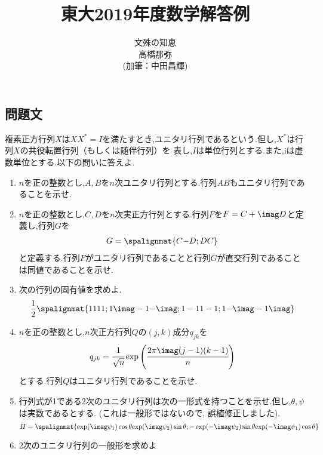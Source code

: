 \documentclass[dvipdfmx,titlepage, 11pt, a4paper]{jsarticle}%
\title{\Huge 東大2019年度数学解答例\\[10mm]}
\author{{\LARGE 文殊の知恵}\\[1mm]\LARGE 高橋那弥\\(加筆：中田昌輝)}
\date{}
\begin{document}
\maketitle
\tableofcontents %
\newpage
\setcounter{tocdepth}{3}%
\section{}%
\subsection{問題文}
複素正方行列$X$は$XX^{\ast}=I$を満たすとき,ユニタリ行列であるという.但し,$X^{\ast}$は行列$X$の共役転置行列（もしくは随伴行列）を
表し,$I$は単位行列とする.また,iは虚数単位とする.以下の問いに答えよ.
\begin{enumerate}[(1)]
    \setlength{\itemsep}{10pt}
    \item $n$を正の整数とし,$A, B$を$n$次ユニタリ行列とする.行列$AB$もユニタリ行列であることを示せ.
    \item $n$を正の整数とし,$C, D$を$n$次実正方行列とする.行列$F$を$F = C + \imag D$と定義し,行列$G$を
    \begin{align*}
        G = \spalignmat{
            C {-D};
            D {C}
        }
    \end{align*}
    と定義する.行列$F$がユニタリ行列であることと行列$G$が直交行列であることは同値であることを示せ.
    \item 次の行列の固有値を求めよ.
    \begin{align*}
        \frac{1}{2}\spalignmat{
            1 1 1 1;
            1 {\imag} -1 {-\imag};
            1 -1 1 -1;
            1 {-\imag} -1 {\imag}
        }
    \end{align*}
    \item $n$を正の整数とし,$n$次正方行列$Q$の$(j, k)$成分$q_{jk}$を
    \begin{equation*}
        q_{jk} = \cfrac{1}{\sqrt{n}}\exp \left(\cfrac{2\pi\imag (j - 1)(k - 1)}{n}\right)
    \end{equation*}
    とする.行列$Q$はユニタリ行列であることを示せ.
    \item 行列式が1である2次のユニタリ行列は次の一形式を持つことを示せ.但し,$\theta, \psi$は実数であるとする. (これは一般形ではないので, 誤植修正しました).
    \begin{equation*}
        H = \spalignmat{
            {\exp(\imag \psi_{1})\cos\theta} {\exp(\imag \psi_{2})\sin\theta};
            {-\exp(-\imag \psi_{2})\sin\theta} {\exp(-\imag \psi_{1})\cos\theta}
        }
    \end{equation*}
    \item 2次のユニタリ行列の一般形を求めよ
\end{enumerate}
\end{document}
